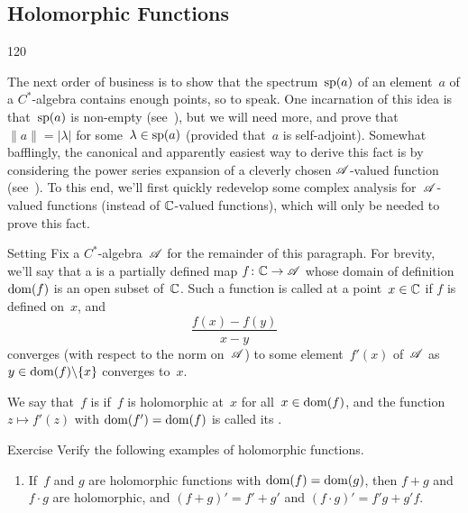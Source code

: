 \subsection{Holomorphic Functions}
\begin{parsec}{120}%
\begin{point}{10}%
The next order of business
is to show that the spectrum~$\mathrm{sp}(a)$ of an element~$a$
of a $C^*$-algebra contains enough points, so to speak.
One incarnation of this idea 
is that~$\mathrm{sp}(a)$ is non-empty
(see~), but
we will need more,
and prove that  $\|a\|=\left|\lambda\right|$
for some~$\lambda\in\mathrm{sp}(a)$
(provided that~$a$ is self-adjoint).
Somewhat bafflingly,
the canonical and apparently
easiest way to derive this fact is by considering the power series
expansion of a cleverly chosen $\mathscr{A}$-valued function
(see~).
To this end,
we'll first quickly redevelop some complex analysis
for~$\mathscr{A}$-valued functions
(instead of $\mathbb{C}$-valued functions),
which will only be needed to prove this fact.
\end{point}
\begin{point}{20}{Setting}%
Fix a $C^*$-algebra~$\mathscr{A}$ for the remainder of this paragraph.
For brevity,
we'll say that a %
is a partially defined map $f\colon \mathbb{C}\to \mathscr{A}$
whose domain of definition $\operatorname{dom}(f)$%
is an open subset of~$\mathbb{C}$.
Such a function is called  at a point~$x\in \mathbb{C}$%
%
if $f$ is defined on~$x$,
and 
\begin{equation*}
\frac{f(x)-f(y)}{x-y}
\end{equation*}
converges (with respect to the norm on~$\mathscr{A}$)
to some element~$f'(x)$ of~$\mathscr{A}$
as $y\in \operatorname{dom}(f)\backslash\{x\}$
converges to~$x$.

We say that~$f$ is 
if~$f$ is holomorphic at~$x$ for all~$x\in \operatorname{dom}(f)$,
and the function $z\mapsto f'(z)$
with $\operatorname{dom}(f')=\operatorname{dom}(f)$
is called its .%
%
\end{point}
\begin{point}{30}{Exercise}%
Verify the following examples of holomorphic functions.
\begin{enumerate}
\item
If~$f$ and $g$ are holomorphic functions with $\operatorname{dom}(f)=\operatorname{dom}(g)$,
then $f+g$ and $f\cdot g$ are holomorphic,
and $(f+g)'=f'+g'$ and $(f\cdot g)' = f'g+g'f$.


\end{enumerate}
\end{point}
\end{parsec}
